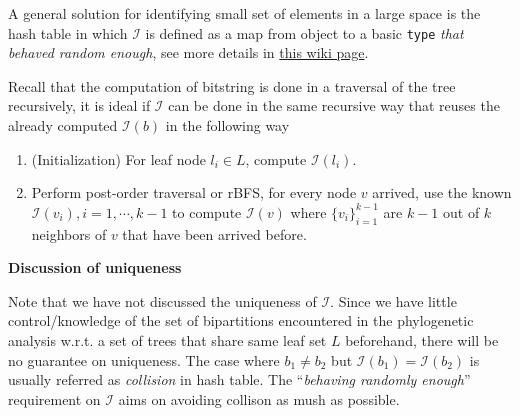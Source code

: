 \documentclass[11pt]{article}
\theoremstyle{definition}
\theoremstyle{remark}
\theoremstyle{plain}
\begin{document}
A general solution for identifying small set of elements in a large space is the hash table in which $\mathcal{I}$ is defined as a map from object to a basic \texttt{type} \emph{that behaved random enough}, see more details in \href{https://en.wikipedia.org/wiki/Hash_table}{this wiki page}.

Recall that the computation of bitstring is done in a traversal of the tree recursively, it is ideal if $\mathcal{I}$ can be done in the same recursive way that reuses the already computed $\mathcal{I}(b)$ in the following way
\begin{enumerate}
	\item (Initialization) For leaf node $l_i\in L$, compute $\mathcal{I}(l_i)$.
	\item Perform post-order traversal or rBFS, for every node $v$ arrived, use the known $\mathcal{I}(v_i), i = 1,\cdots, k-1$ to compute $\mathcal{I}(v)$ where $\{v_i\}_{i=1}^{k-1}$ are $k-1$ out of $k$ neighbors of $v$ that have been arrived before. 
\end{enumerate}

\noindent\textbf{Discussion of uniqueness}

Note that we have not discussed the uniqueness of $\mathcal{I}$. Since we have little control/knowledge of the set of bipartitions encountered in the phylogenetic analysis w.r.t. a set of trees that share same leaf set $L$ beforehand, there will be no guarantee on uniqueness. The case where $b_1 \neq b_2$ but $\mathcal{I}(b_1)=\mathcal{I}(b_2)$ is usually referred as \emph{collision} in hash table. The ``\emph{behaving randomly enough}'' requirement on $\mathcal{I}$ aims on avoiding collison as mush as possible. 
\end{document}
